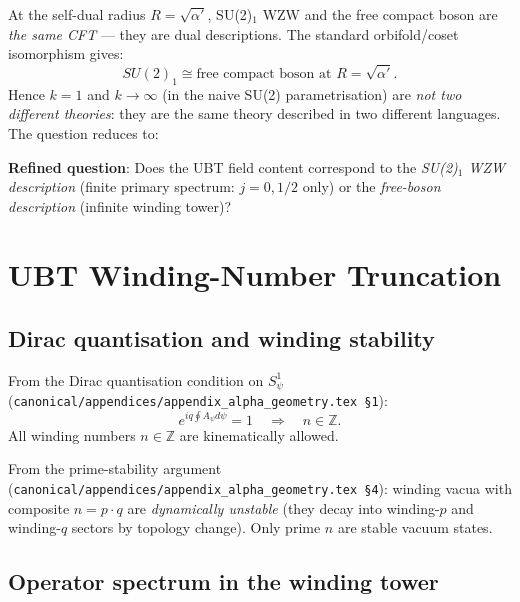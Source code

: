 \documentclass[12pt,a4paper]{article}
\theoremstyle{definition}
\theoremstyle{remark}
\begin{document}
At the self-dual radius $R = \sqrt{\alpha'}$, SU(2)$_1$ WZW and the free compact
boson are \emph{the same CFT} — they are dual descriptions.  The standard
orbifold/coset isomorphism gives:
\begin{equation}
  SU(2)_1 \cong \text{free compact boson at } R = \sqrt{\alpha'}.
  \label{eq:m4:su2_1_iso}
\end{equation}
Hence $k = 1$ and $k \to \infty$ (in the naive SU(2) parametrisation) are
\emph{not two different theories}: they are the same theory described in two
different languages.  The question reduces to:

\begin{insightbox}
\textbf{Refined question}: Does the UBT field content correspond to the
\emph{SU(2)$_1$ WZW description} (finite primary spectrum: $j = 0, 1/2$ only)
or the \emph{free-boson description} (infinite winding tower)?
\end{insightbox}

\section{UBT Winding-Number Truncation}
\label{sec:m4:truncation}

\subsection{Dirac quantisation and winding stability}
\label{sec:m4:dirac}

From the Dirac quantisation condition on $S^1_\psi$
(\texttt{canonical/appendices/appendix\_alpha\_geometry.tex \S1}):
\begin{equation}
  e^{iq \oint A_\psi d\psi} = 1 \quad \Longrightarrow \quad n \in \mathbb{Z}.
  \label{eq:m4:dirac}
\end{equation}
All winding numbers $n \in \mathbb{Z}$ are kinematically allowed.

From the prime-stability argument
(\texttt{canonical/appendices/appendix\_alpha\_geometry.tex \S4}):
winding vacua with composite $n = p \cdot q$ are \emph{dynamically unstable}
(they decay into winding-$p$ and winding-$q$ sectors by topology change).
Only prime $n$ are stable vacuum states.

\subsection{Operator spectrum in the winding tower}
\end{document}
